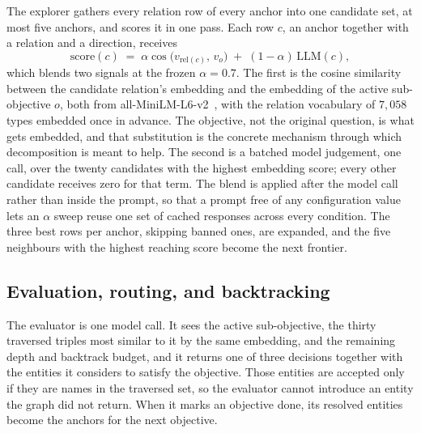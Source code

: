 The explorer gathers every relation row of every anchor into one
candidate set, at most five anchors, and scores it in one pass. Each
row $c$, an anchor together with a relation and a direction, receives
\begin{equation}\label{eq:score}
  \mathrm{score}(c) \;=\; \alpha \cos\!\big(v_{\mathrm{rel}(c)},\,
  v_{o}\big) \;+\; (1-\alpha)\, \mathrm{LLM}(c),
\end{equation}
which blends two signals at the frozen $\alpha = 0.7$. The first is the
cosine similarity between the candidate relation's embedding and the
embedding of the active sub-objective $o$, both from
\textsf{all-MiniLM-L6-v2}~\cite{reimers2019sentence}, with the relation
vocabulary of $7{,}058$ types embedded once in advance. The objective,
not the original question, is what gets embedded, and that substitution
is the concrete mechanism through which decomposition is meant to help.
The second is a batched model judgement, one call, over the twenty
candidates with the highest embedding score; every other candidate
receives zero for that term. The blend is applied after the model call
rather than inside the prompt, so that a prompt free of any
configuration value lets an $\alpha$ sweep reuse one set of cached
responses across every condition. The three best rows per anchor,
skipping banned ones, are expanded, and the five neighbours with the
highest reaching score become the next frontier.

\subsection{Evaluation, routing, and backtracking}\label{app:routing}

The evaluator is one model call. It sees the active sub-objective, the
thirty traversed triples most similar to it by the same embedding, and
the remaining depth and backtrack budget, and it returns one of three
decisions together with the entities it considers to satisfy the
objective. Those entities are accepted only if they are names in the
traversed set, so the evaluator cannot introduce an entity the graph did
not return. When it marks an objective done, its resolved entities
become the anchors for the next objective.

